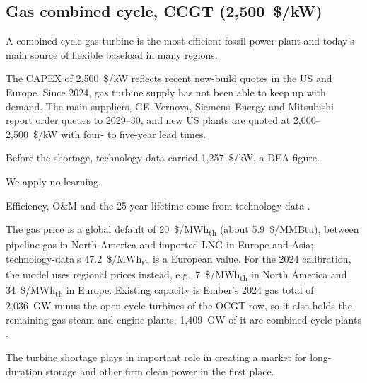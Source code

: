 \subsection{Gas combined cycle, CCGT (2,500~\$/kW)}\label{sec:CCGT}
A combined-cycle gas turbine is the most efficient fossil power plant and today's main source of flexible baseload in many regions.

The CAPEX of 2,500~\$/kW reflects recent new-build quotes in the US and Europe.
Since 2024, gas turbine supply has not been able to keep up with demand.
The main suppliers, GE~Vernova, Siemens~Energy and Mitsubishi report order queues to 2029--30, and new US plants are quoted at 2,000--2,500~\$/kW with four- to five-year lead times.

Before the shortage, technology-data \citep{technologydata} carried 1,257~\$/kW, a DEA figure.

We apply no learning.

Efficiency, O\&M and the 25-year lifetime come from technology-data \citep{technologydata}.

The gas price is a global default of 20~\$/MWh\textsubscript{th} (about 5.9~\$/MMBtu), between pipeline gas in North America and imported LNG in Europe and Asia; technology-data's 47.2~\$/MWh\textsubscript{th} \citep{technologydata} is a European value.
For the 2024 calibration, the model uses regional prices instead, e.g.\ 7~\$/MWh\textsubscript{th} in North America and 34~\$/MWh\textsubscript{th} in Europe.
Existing capacity is Ember's 2024 gas total of 2,036~GW \citep{ember2025} minus the open-cycle turbines of the OCGT row, so it also holds the remaining gas steam and engine plants; 1,409~GW of it are combined-cycle plants \citep{gemgogpt}.

The turbine shortage plays in important role in creating a market for long-duration storage and other firm clean power in the first place.
